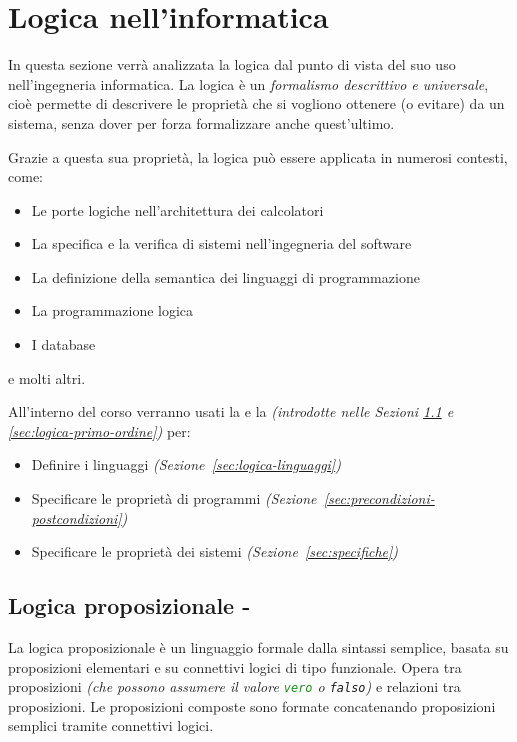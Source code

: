 \documentclass[italian, 10pt]{article}
\newcommand{\vero}{\textcolor{ForestGreen}{\texttt{vero}}\xspace} %
\newcommand{\falso}{\textcolor{BrickRed}{\texttt{falso}}\xspace} %
\begin{document}
\clearpage

\section{Logica nell'informatica}
\label{sec:logica}

In questa sezione verrà analizzata la logica dal punto di vista del suo uso nell'ingegneria informatica.
La logica è un \textit{formalismo descrittivo e universale}, cioè permette di descrivere le proprietà che si vogliono ottenere (o evitare) da un sistema, senza dover per forza formalizzare anche quest'ultimo.

Grazie a questa sua proprietà, la logica può essere applicata in numerosi contesti, come:

\begin{itemize}
  \item Le porte logiche nell'architettura dei calcolatori
  \item La specifica e la verifica di sistemi nell'ingegneria del software
  \item La definizione della semantica dei linguaggi di programmazione
  \item La programmazione logica
  \item I database
\end{itemize}

e molti altri.

All'interno del corso verranno usati la \PL e la \FOL \textit{(introdotte nelle Sezioni \ref{sec:logica-proposizionale} e \ref{sec:logica-primo-ordine})} per:

\begin{itemize}
  \item Definire i linguaggi \textit{(Sezione~\ref{sec:logica-linguaggi})}
  \item Specificare le proprietà di programmi \textit{(Sezione~\ref{sec:precondizioni-postcondizioni})}
  \item Specificare le proprietà dei sistemi \textit{(Sezione~\ref{sec:specifiche})}
\end{itemize}

\subsection{Logica proposizionale - \PL}
\label{sec:logica-proposizionale}

La logica proposizionale è un linguaggio formale dalla sintassi semplice, basata su proposizioni elementari e su connettivi logici di tipo funzionale.
Opera tra proposizioni \textit{(che possono assumere il valore \vero o \falso)} e relazioni tra proposizioni.
Le proposizioni composte sono formate concatenando proposizioni semplici tramite connettivi logici.
\end{document}
